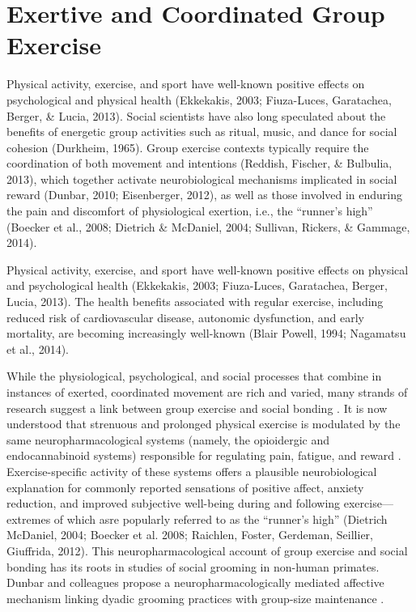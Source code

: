 \section{Exertive and Coordinated Group Exercise}
Physical activity, exercise, and sport have well-known positive effects on psychological and physical health (Ekkekakis, 2003; Fiuza-Luces, Garatachea, Berger, \& Lucia, 2013).
Social scientists have also long speculated about the benefits of energetic group activities such as ritual, music, and dance for social cohesion (Durkheim, 1965).  Group exercise contexts typically require the coordination of both movement and intentions (Reddish, Fischer, \& Bulbulia, 2013), which together activate neurobiological mechanisms implicated in social reward (Dunbar, 2010; Eisenberger, 2012), as well as those involved in enduring the pain and discomfort of physiological exertion, i.e., the ``runner’s high'' (Boecker et al., 2008; Dietrich \& McDaniel, 2004; Sullivan, Rickers, \& Gammage, 2014).

Physical activity, exercise, and sport have well-known positive effects on physical and  psychological health (Ekkekakis, 2003; Fiuza-Luces, Garatachea, Berger,  Lucia, 2013).
The health benefits associated with regular exercise, including reduced risk of cardiovascular disease, autonomic dysfunction, and early mortality, are becoming increasingly well-known (Blair  Powell, 1994; Nagamatsu et al., 2014).

While the physiological, psychological, and social processes that combine in instances of exerted, coordinated movement are rich and varied, many strands of research suggest a link between group exercise and social bonding \citep{Davis2015,Cohen2017}. It is now understood that strenuous and prolonged physical exercise is modulated by the same neuropharmacological systems (namely, the opioidergic and endocannabinoid systems) responsible for regulating pain, fatigue, and reward \citep{Boecker2008,Raichlen2013}.
Exercise-specific activity of these systems offers a plausible neurobiological explanation for commonly reported sensations of positive affect, anxiety reduction, and improved subjective well-being during and following exercise---extremes of which asre popularly referred to as the ``runner's high'' (Dietrich  McDaniel, 2004; Boecker et al. 2008; Raichlen, Foster, Gerdeman, Seillier,  Giuffrida, 2012).  This neuropharmacological account of group exercise and social bonding has its roots in studies of social grooming in non-human primates.  Dunbar and colleagues propose a neuropharmacologically mediated affective mechanism linking dyadic grooming practices with group-size maintenance \citep{Machin2011}.

